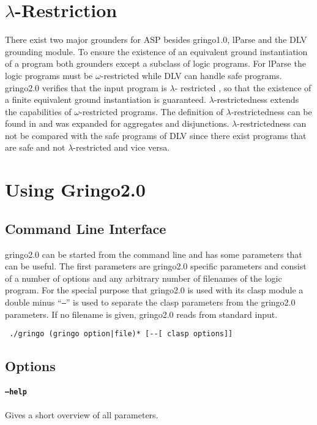 \documentclass[a4paper,10pt]{article}
\begin{document}
\section{$\lambda$-Restriction}
\label{domainrestricted}
There exist two major grounders for ASP besides gringo1.0, lParse \cite{lparseManual} and  the DLV grounding module\cite{DLV}.
To ensure the existence of an equivalent ground instantiation of a program both grounders except a subclass of logic programs. For lParse the logic programs must be $\omega$-restricted\cite{omega} while DLV can handle safe programs\cite{safe}.
gringo2.0 verifies that the input program is $\lambda$-
restricted \cite{gringopaper}, so that the existence of a finite equivalent ground instantiation is guaranteed. 
$\lambda$-restrictedness extends the capabilities of $\omega$-restricted programs. The definition of $\lambda$-restrictedness can be found in \cite{gringopaper} and was expanded for aggregates and disjunctions.
$\lambda$-restrictedness can not be compared with the safe programs of DLV since there exist programs that are safe and not $\lambda$-restricted and vice versa.


\section{Using Gringo2.0}
\subsection{Command Line Interface}
gringo2.0 can be started from the command line and has some parameters that can be useful.
The first parameters are gringo2.0 specific parameters and consist of a number of options and any arbitrary number of filenames of the logic program. For the special purpose that gringo2.0 is used with its clasp module a double minus ``\texttt{--}'' is used to separate the clasp parameters from the gringo2.0 parameters.
If no filename is given, gringo2.0 reads from standard input.
\begin{verbatim}
 ./gringo (gringo option|file)* [--[ clasp options]]
\end{verbatim}
\subsection{Options}

\paragraph{\texttt{--help}}
Gives a short overview of all parameters.
\end{document}
